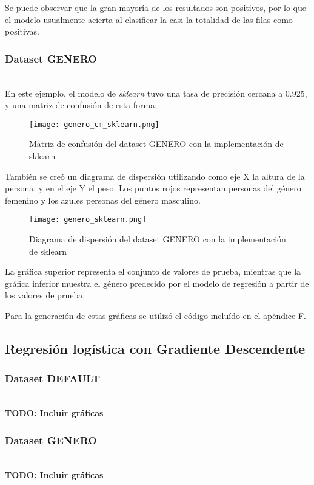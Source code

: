 \documentclass[sigconf,authorversion,nonacm]{acmart}
\begin{document}
Se puede observar que la gran mayoría de los resultados son positivos, por lo que el modelo usualmente acierta al clasificar la casi la totalidad de las filas como positivas.

\subsubsection{Dataset GENERO}\hfill\\
En este ejemplo, el modelo de \textit{sklearn} tuvo una tasa de precisión cercana a 0.925, y una matriz de confusión de esta forma:

\begin{figure}[H]
  \centering
  \texttt{[image: genero\_cm\_sklearn.png]}
  \caption{Matriz de confusión del dataset GENERO con la implementación de sklearn}
\end{figure}

También se creó un diagrama de dispersión utilizando como eje X la altura de la persona, y en el eje Y el peso. Los puntos rojos representan personas del género femenino y los azules personas del género masculino.

\begin{figure}[H]
  \centering
  \texttt{[image: genero\_sklearn.png]}
  \caption{Diagrama de dispersión del dataset GENERO con la implementación de sklearn}
\end{figure}

La gráfica superior representa el conjunto de valores de prueba, mientras que la gráfica inferior muestra el género predecido por el modelo de regresión a partir de los valores de prueba.

Para la generación de estas gráficas se utilizó el código incluído en el apéndice F.

\subsection{Regresión logística con Gradiente Descendente}

\subsubsection{Dataset DEFAULT}\hfill\\
\textbf{TODO: Incluir gráficas}

\subsubsection{Dataset GENERO}\hfill\\
\textbf{TODO: Incluir gráficas}
\end{document}

